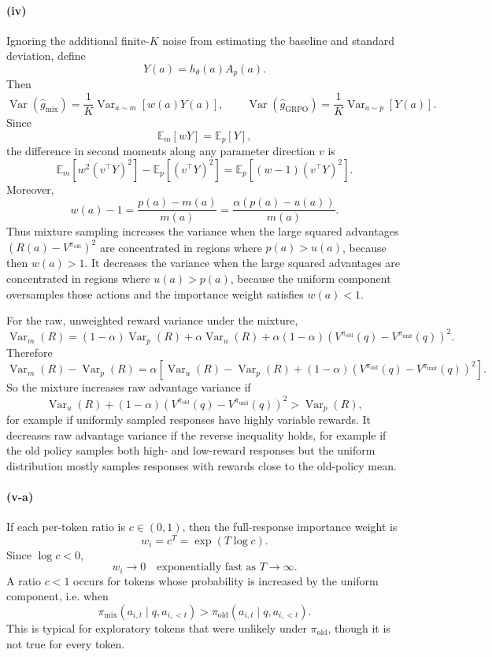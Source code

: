 \paragraph{(iv)}
Ignoring the additional finite-\(K\) noise from estimating the baseline and
standard deviation, define
\[
Y(a)=h_\theta(a)A_p(a).
\]
Then
\[
\operatorname{Var}(\hat g_{\mathrm{mix}})
=
\frac{1}{K}\operatorname{Var}_{a\sim m}[w(a)Y(a)],
\qquad
\operatorname{Var}(\hat g_{\mathrm{GRPO}})
=
\frac{1}{K}\operatorname{Var}_{a\sim p}[Y(a)].
\]
Since
\[
\mathbb E_m[wY]=\mathbb E_p[Y],
\]
the difference in second moments along any parameter direction \(v\) is
\[
\mathbb E_m[w^2(v^\top Y)^2]
-
\mathbb E_p[(v^\top Y)^2]
=
\mathbb E_p[(w-1)(v^\top Y)^2].
\]
Moreover,
\[
w(a)-1
=
\frac{p(a)-m(a)}{m(a)}
=
\frac{\alpha(p(a)-u(a))}{m(a)}.
\]
Thus mixture sampling increases the variance when the large squared advantages
\((R(a)-V^{\pi_{\mathrm{old}}})^2\) are concentrated in regions where
\(p(a)>u(a)\), because then \(w(a)>1\). It decreases the variance when the large
squared advantages are concentrated in regions where \(u(a)>p(a)\), because the
uniform component oversamples those actions and the importance weight satisfies
\(w(a)<1\).

For the raw, unweighted reward variance under the mixture,
\[
\operatorname{Var}_m(R)
=
(1-\alpha)\operatorname{Var}_p(R)
+
\alpha \operatorname{Var}_u(R)
+
\alpha(1-\alpha)
\left(
V^{\pi_{\mathrm{old}}}(q)
-
V^{\pi_{\mathrm{unif}}}(q)
\right)^2.
\]
Therefore
\[
\operatorname{Var}_m(R)-\operatorname{Var}_p(R)
=
\alpha
\left[
\operatorname{Var}_u(R)
-
\operatorname{Var}_p(R)
+
(1-\alpha)
\left(
V^{\pi_{\mathrm{old}}}(q)
-
V^{\pi_{\mathrm{unif}}}(q)
\right)^2
\right].
\]
So the mixture increases raw advantage variance if
\[
\operatorname{Var}_u(R)
+
(1-\alpha)
\left(
V^{\pi_{\mathrm{old}}}(q)
-
V^{\pi_{\mathrm{unif}}}(q)
\right)^2
>
\operatorname{Var}_p(R),
\]
for example if uniformly sampled responses have highly variable rewards. It
decreases raw advantage variance if the reverse inequality holds, for example if
the old policy samples both high- and low-reward responses but the uniform
distribution mostly samples responses with rewards close to the old-policy mean.

\paragraph{(v-a)}
If each per-token ratio is \(c\in(0,1)\), then the full-response importance
weight is
\[
w_i=c^T=\exp(T\log c).
\]
Since \(\log c<0\),
\[
\boxed{
w_i\to 0
\quad\text{exponentially fast as }T\to\infty.
}
\]
A ratio \(c<1\) occurs for tokens whose probability is increased by the uniform
component, i.e. when
\[
\pi_{\mathrm{mix}}(a_{i,t}\mid q,a_{i,<t})
>
\pi_{\mathrm{old}}(a_{i,t}\mid q,a_{i,<t}).
\]
This is typical for exploratory tokens that were unlikely under
\(\pi_{\mathrm{old}}\), though it is not true for every token.

